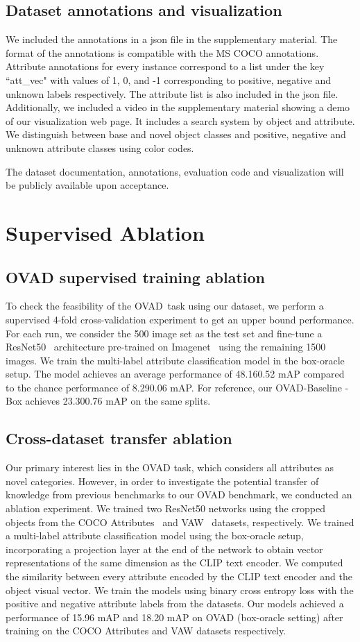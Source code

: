 \documentclass[10pt,twocolumn,letterpaper]{article}
\newcommand{\modelname}{OVAD-Baseline }
\newcommand{\taskname}{OVAD}
\begin{document}
\subsection{Dataset annotations and visualization}
We included the annotations in a json file in the supplementary material. The format of the annotations is compatible with the MS COCO annotations. Attribute annotations for every instance correspond to a list under the key ``att\_vec" with values of 1, 0, and -1 corresponding to positive, negative and unknown labels respectively. The attribute list is also included in the json file. Additionally, we included a video in the supplementary material showing a demo of our visualization web page. It includes a search system by object and attribute. We distinguish between base and novel object classes and positive, negative and unknown attribute classes using color codes. 

The dataset documentation, annotations, evaluation code and visualization will be publicly available upon acceptance. 
\section{Supervised Ablation}
\subsection{OVAD supervised training ablation}

To check the feasibility of the \taskname\ task using our dataset, we perform a supervised 4-fold cross-validation experiment to get an upper bound performance. 
For each run, we consider the 500 image set as the test set and fine-tune a ResNet50~\cite{resnet} architecture pre-trained on Imagenet~\cite{deng2009imagenet} using the remaining 1500 images.
We train the multi-label attribute classification model in the box-oracle setup.
The model achieves an average performance of 48.16{\small0.52} mAP compared to the chance performance of 8.29{\small0.06} mAP.
For reference, our \modelname-Box achieves 23.30{\small0.76} mAP on the same splits.  \subsection{Cross-dataset transfer ablation}
Our primary interest lies in the OVAD task, which considers all attributes as novel categories. However, in order to investigate the potential transfer of knowledge from previous benchmarks to our OVAD benchmark, we conducted an ablation experiment. We trained two ResNet50 networks using the cropped objects from the COCO Attributes~\cite{coco_attributes} and VAW~\cite{vaw} datasets, respectively. We trained a multi-label attribute classification model using the box-oracle setup, incorporating a projection layer at the end of the network to obtain vector representations of the same dimension as the CLIP text encoder. We computed the similarity between every attribute encoded by the CLIP text encoder and the object visual vector. We train the models using binary cross entropy loss with the positive and negative attribute labels from the datasets. Our models achieved a performance of 15.96 mAP and 18.20 mAP on OVAD (box-oracle setting) after training on the COCO Attributes and VAW datasets respectively. 
\end{document}
